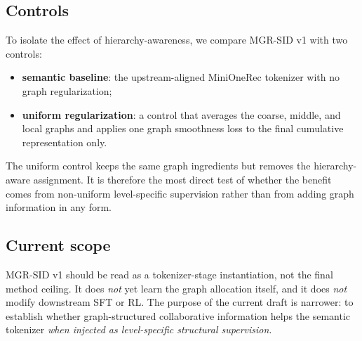 \subsection{Controls}

To isolate the effect of hierarchy-awareness, we compare MGR-SID v1 with two controls:
\begin{itemize}[leftmargin=1.4em]
  \item \textbf{semantic baseline}: the upstream-aligned MiniOneRec \rqvae{} tokenizer with no graph regularization;
  \item \textbf{uniform regularization}: a control that averages the coarse, middle, and local graphs and applies one graph smoothness loss to the final cumulative representation only.
\end{itemize}
The uniform control keeps the same graph ingredients but removes the hierarchy-aware assignment. It is therefore the most direct test of whether the benefit comes from non-uniform level-specific supervision rather than from adding graph information in any form.

\subsection{Current scope}

MGR-SID v1 should be read as a tokenizer-stage instantiation, not the final method ceiling. It does \emph{not} yet learn the graph allocation itself, and it does \emph{not} modify downstream SFT or RL. The purpose of the current draft is narrower: to establish whether graph-structured collaborative information helps the semantic tokenizer \emph{when injected as level-specific structural supervision}.
